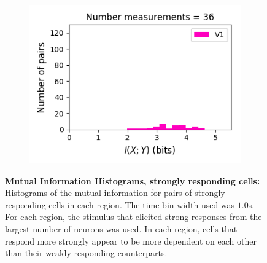 \documentclass[a4paper,12pt]{article}
\theoremstyle{definition}
\begin{document}
\begin{figure}[p]
\begin{subfigure}{0.5\textwidth}
    \includegraphics[width=\textwidth]{figures/strong_v1_6_1p0_information_histogram.png}
  \end{subfigure}
  \caption{\textbf{Mutual Information Histograms, strongly responding cells:} Histograms of the mutual information for pairs of strongly responding cells in each region. The time bin width used was $1.0$s. For each region, the stimulus that elicited strong responses from the largest number of neurons was used. In each region, cells that respond more strongly appear to be more dependent on each other than their weakly responding counterparts.}
  \label{fig:strong_info_histograms}
\end{figure}
\end{document}

